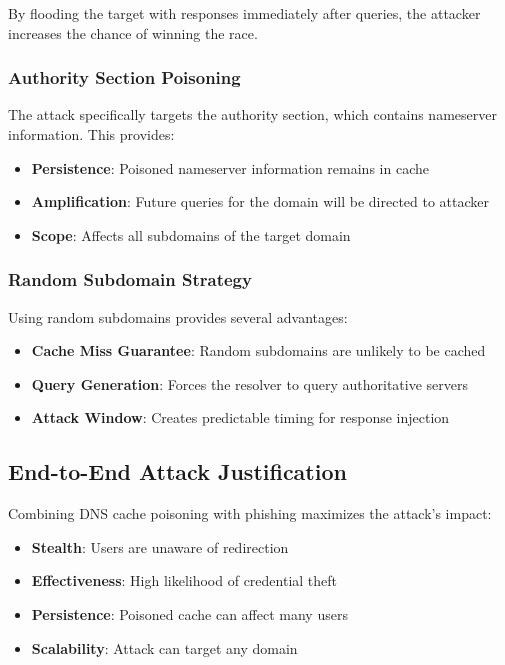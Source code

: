 \documentclass[12pt,a4paper]{article}
\begin{document}
By flooding the target with responses immediately after queries, the attacker increases the chance of winning the race.

\subsubsection{ Authority Section Poisoning}

The attack specifically targets the authority section, which contains nameserver information. This provides:

\begin{itemize}
    \item \textbf{Persistence}: Poisoned nameserver information remains in cache
    \item \textbf{Amplification}: Future queries for the domain will be directed to attacker
    \item \textbf{Scope}: Affects all subdomains of the target domain
\end{itemize}

\subsubsection{ Random Subdomain Strategy}

Using random subdomains provides several advantages:

\begin{itemize}
    \item \textbf{Cache Miss Guarantee}: Random subdomains are unlikely to be cached
    \item \textbf{Query Generation}: Forces the resolver to query authoritative servers
    \item \textbf{Attack Window}: Creates predictable timing for response injection
\end{itemize}

\subsection{End-to-End Attack Justification}

Combining DNS cache poisoning with phishing maximizes the attack's impact:
\begin{itemize}
    \item \textbf{Stealth}: Users are unaware of redirection
    \item \textbf{Effectiveness}: High likelihood of credential theft
    \item \textbf{Persistence}: Poisoned cache can affect many users
    \item \textbf{Scalability}: Attack can target any domain
\end{itemize}
\end{document}
